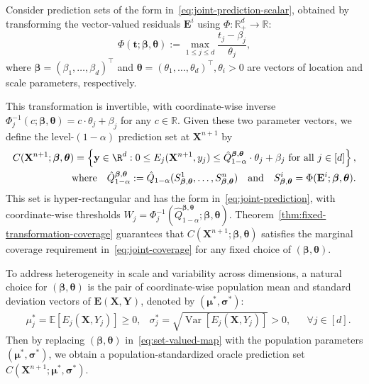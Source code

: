 {\color{blue}
Consider prediction sets of the form in~\eqref{eq:joint-prediction-scalar}, obtained by transforming the vector-valued residuals $\mathbf{E}^i$ using $\Phi : \mathbb{R}^{d}_+ \to \mathbb{R}$:
\begin{equation}
\Phi(\mathbf t; \boldsymbol \beta, \boldsymbol \theta)
:= \max_{1 \le j \le d} \frac{t_j - \beta_j}{\theta_j},
\label{eq:residual-transformation}
\end{equation}
where $\boldsymbol \beta = (\beta_1, \ldots, \beta_d)^\top$ and $\boldsymbol \theta = (\theta_1, \ldots, \theta_d)^\top, \theta_i > 0$ are vectors of location and scale parameters, respectively. 

This transformation is invertible, with coordinate-wise inverse $\Phi^{-1}_j (c; \boldsymbol \beta, \boldsymbol \theta) = c \cdot \theta_j + \beta_j$ for any $c \in \mathbb{R}$. 
Given these two parameter vectors, we define the level-$(1-\alpha)$ prediction set at $\mathbf{X}^{n+1}$ by
\begin{equation}\label{eq:set-valued-map}
\begin{aligned}
C(\mathbf{X}^{n+1};\boldsymbol \beta, \boldsymbol \theta) = \left\{\mathbf y \in \R^d: 0\leq E_j(\mathbf{X}^{n+1}, y_j) \leq {\hat{Q}^{\boldsymbol{\beta},\boldsymbol{\theta}}_{1-\alpha} \cdot \theta_j + \beta_j}\text{ for all } j \in [d]\right\},\\
\text{where}\quad
\hat{Q}^{\boldsymbol{\beta},\boldsymbol{\theta}}_{1-\alpha}:= \hat{Q}_{1-\alpha}(S^1_{\boldsymbol{\beta}, \boldsymbol{\theta}},\ldots,S^n_{\boldsymbol{\beta}, \boldsymbol{\theta}})
\quad
\text{and}
\quad
S^i_{\boldsymbol{\beta}, \boldsymbol{\theta}} = \Phi(\mathbf{E}^i; \boldsymbol{\beta}, \boldsymbol{\theta}).
\end{aligned}
\end{equation}
This set is hyper-rectangular and has the form in~\eqref{eq:joint-prediction}, with coordinate-wise thresholds $W_j = \Phi^{-1}_j (\hat{Q}^{\boldsymbol{\beta},\boldsymbol{\theta}}_{1-\alpha}; \boldsymbol \beta, \boldsymbol \theta)$.
Theorem~\ref{thm:fixed-transformation-coverage} guarantees that $C(\mathbf{X}^{n+1};\boldsymbol \beta, \boldsymbol \theta)$ satisfies the marginal coverage requirement in~\eqref{eq:joint-coverage} for any fixed choice of $(\boldsymbol \beta, \boldsymbol \theta)$.

To address heterogeneity in scale and variability across dimensions, a natural choice for $(\boldsymbol \beta, \boldsymbol \theta)$ is the pair of coordinate-wise population mean and standard deviation vectors of $\mathbf E(\mathbf X, \mathbf Y)$, denoted by $(\boldsymbol\mu^*, \boldsymbol\sigma^*)$:
\begin{align} \label{eq:oracle-mean-std}
&\mu^*_j = \mathbb{E}[E_j(\mathbf X, Y_j)] \geq 0,
&\sigma^*_j = \sqrt{\operatorname{Var}[E_j(\mathbf X, Y_j)]} > 0,
&&\forall j \in [d].
\end{align}
Then by replacing $(\boldsymbol \beta, \boldsymbol \theta)$ in~\eqref{eq:set-valued-map} with the population parameters $(\boldsymbol\mu^*, \boldsymbol\sigma^*)$, we obtain a population-standardized oracle prediction set $C(\mathbf{X}^{n+1}; \boldsymbol\mu^*, \boldsymbol\sigma^*)$. 
}

